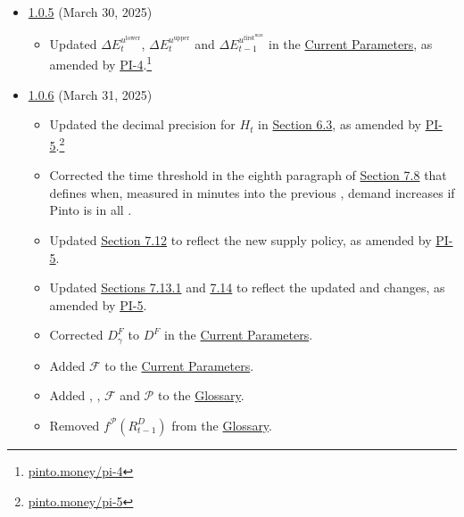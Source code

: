 \documentclass[class=article, crop=false]{standalone}
\begin{document}
\begin{itemize}[topsep=0pt, itemsep=3pt,leftmargin=16pt]
    \item \href{https://github.com/pinto-org/whitepaper/blob/master/version-history/pinto1_0_5.pdf}{1.0.5} (March 30, 2025)
    
    \begin{itemize}
        \item Updated $\Delta E_{t}^{u^{\text{lower}}}$, $\Delta E_{t}^{u^{\text{upper}}}$ and $\Delta E_{t-1}^{u^{\text{first}^{\text{max}}}}$ in the \hyperlink{subsection.12.1}{Current Parameters}, as amended by \href{https://pinto.money/pi-4}{PI-4}.\footnote{\href{https://pinto.money/pi-4}{pinto.money/pi-4}}       
    \end{itemize}


    \item \href{https://github.com/pinto-org/whitepaper/blob/master/version-history/pinto1_0_6.pdf}{1.0.6} (March 31, 2025)
    
    \begin{itemize}
        \item Updated the decimal precision for $H_{t}$ in \hyperlink{subsection.6.3}{Section 6.3}, as amended by \href{https://pinto.money/pi-5}{PI-5}.\footnote{\href{https://pinto.money/pi-5}{pinto.money/pi-5}} 
        \item Corrected the time threshold in the eighth paragraph of \hyperlink{subsection.7.8}{Section 7.8} that defines when, measured in minutes into the previous ,  demand increases if Pinto is  in all .
        \item Updated \hyperlink{subsection.7.12}{Section 7.12} to reflect the new  supply policy, as amended by \href{https://pinto.money/pi-5}{PI-5}.
        \item Updated \hyperlink{subsubsection.7.13.1}{Sections 7.13.1} and \hyperlink{subsection.7.14}{7.14} to reflect the updated  and  changes, as amended by \href{https://pinto.money/pi-5}{PI-5}.
        \item Corrected $D_{\gamma}^{F}$ to $D^{F}$ in the \hyperlink{subsection.12.1}{Current Parameters}.
        \item Added $\mathscr{F}$ to the \hyperlink{subsection.12.1}{Current Parameters}.
        \item Added , , $\mathscr{F}$ and $\mathscr{P}$ to the \hyperlink{subsection.12.14}{Glossary}.
        \item Removed $f^{\mathscr{P}}(R_{t-1}^{D})$ from the \hyperlink{subsection.12.14}{Glossary}.
    \end{itemize}
    
\end{itemize}
\end{document}
